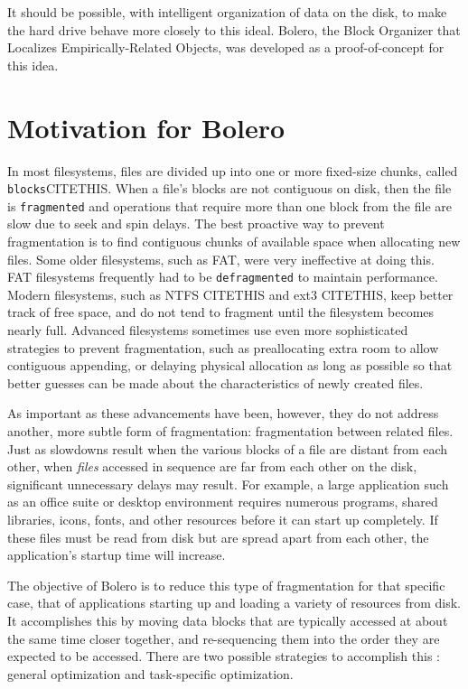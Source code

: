 \documentclass[10pt,twocolumn,letterpaper]{article}
\begin{document}
It should be possible, with intelligent organization of data on the disk, to make the hard drive behave
more closely to this ideal. Bolero, the Block Organizer that Localizes Empirically-Related Objects, was developed as a proof-of-concept for this idea.

\section{Motivation for Bolero}\label{sec:motive}

In most filesystems, files are divided up
into one or more fixed-size chunks, called \texttt{blocks}CITETHIS. When a file's blocks
are not contiguous on disk, then the file is \texttt{fragmented}
and operations that require more than one block from the file are slow due to
seek and spin delays. The best proactive way to prevent fragmentation is to find contiguous
chunks of available space when allocating new files. Some older filesystems, such as FAT, were
very ineffective at doing this\cite{fathistory}.
FAT filesystems frequently had to be \texttt{defragmented} to maintain performance.
Modern filesystems, such as NTFS CITETHIS and ext3 CITETHIS, keep better track of free space,
and do not tend to fragment until the filesystem becomes nearly full. Advanced filesystems sometimes
use even more sophisticated strategies to prevent fragmentation, such as preallocating extra room to allow 
contiguous appending, or delaying physical allocation as long as possible so that better guesses
can be made about the characteristics of newly created files\cite{xfs}.

As important as these advancements have been, however, they do not address another, more subtle form of fragmentation: fragmentation between related files.
Just as slowdowns result when the various blocks of a file are distant from each other, when \emph{files} accessed in sequence are far from each other on the disk, significant unnecessary delays may result. For example, a large application such as an office suite or desktop environment requires numerous programs, shared libraries, icons, fonts, and other resources before it can start up completely. If these files must be read from disk but are spread apart from each other, the application's startup time will increase.

The objective of Bolero is to reduce this type of fragmentation for that specific case, that of applications
starting up and loading a variety of resources from disk. It accomplishes this by moving data blocks that are typically accessed at about the same time closer together, and re-sequencing them into the order they are expected to be accessed. There are two possible strategies to accomplish this : general optimization and task-specific optimization.
\end{document}
